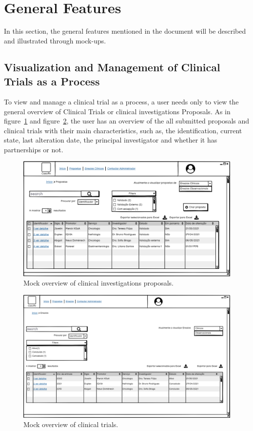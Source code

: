 \section{General Features}
\label{sec:general-features}
In this section, the general features mentioned in the document will be described and illustrated through mock-ups.

\subsection{Visualization and Management of Clinical Trials as a Process}
\label{subsec:visualization-clinical-trials-as-process}
To view and manage a clinical trial as a process, a user needs only to view the general overview of Clinical Trials or clinical investigations Proposals.
As in figure~\ref{fig:propostas} and figure~\ref{fig:ensaios}, the user has an overview of the all submitted proposals and clinical trials with their main characteristics, such as, the identification, current state, last alteration date, the principal investigator and whether it has partnerships or not.

\begin{figure}[H]
    \centering
    \includegraphics[scale=0.35]{images/proposals.png}
    \caption{Mock overview of clinical investigations proposals.}
    \label{fig:propostas}
\end{figure}

\begin{figure}[H]
    \centering
    \includegraphics[scale=0.35]{images/ensaios.png}
    \caption{Mock overview of clinical trials.}
    \label{fig:ensaios}
\end{figure}


